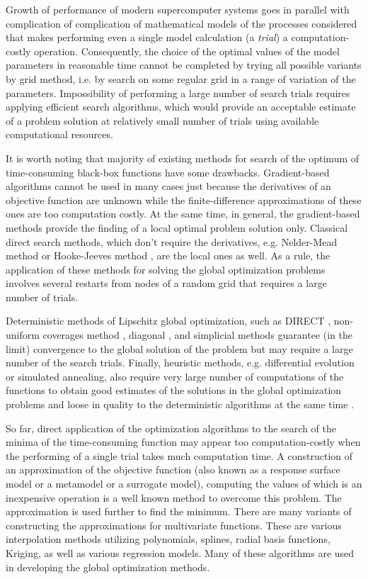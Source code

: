 \documentclass[applsci,article,submit,moreauthors,pdftex]{Definitions/mdpi}
\begin{document}
Growth of performance of modern supercomputer systems goes in parallel with complication of complication of mathematical models of the processes considered that makes performing even a single model calculation (a \textit{trial}) a computation-costly operation. Consequently, the choice of the optimal values of the model parameters in reasonable time cannot be completed by trying all possible variants by grid method, i.e. by search on some regular grid in a range of variation of the parameters. Impossibility of performing a large number of search trials requires applying efficient search algorithms, which would provide an acceptable estimate of a problem solution at relatively small number of trials using available computational resources.

It is worth noting that majority of existing methods for search of the optimum of time-consuming black-box functions have some drawbacks. Gradient-based algorithms cannot be used in many cases just because the derivatives of an objective function are unknown while the finite-difference approximations of these ones are too computation costly. At the same time, in general, the gradient-based methods provide the finding of a local optimal problem solution only.
Classical direct search methods, which don't require the derivatives, e.g. Nelder-Mead method \cite{NelderMead} or Hooke-Jeeves method \cite{HookJeeves}, are the local ones as well. As a rule, the application of these methods for solving the global optimization problems involves several restarts from nodes of a random grid that requires a large number of trials. 

Deterministic methods of Lipschitz global optimization, such as DIRECT \cite{Jones2009}, non-uniform coverages method \cite{Evtushenko2009, Evtushenko2013}, diagonal \cite{Sergeyev2017}, and simplicial \cite{Zilinskas2014} methods guarantee (in the limit) convergence to the global solution of the problem but may require a large number of the search trials.
Finally, heuristic methods, e.g. differential evolution or simulated annealing, also require very large number of computations of the functions to obtain good estimates of the solutions in the global optimization problems and loose in quality to the deterministic algorithms at the same time \cite{Sergeyev2018,Kvasov2018}.

So far, direct application of the optimization algorithms to the search of the minima of the time-consuming function may appear too computation-costly when the performing of a single trial takes much computation time.
A construction of an approximation of the objective function (also known as a response surface model or a metamodel or a surrogate model), computing the values of which is an inexpensive operation is a well known method to overcome this problem. The approximation is used further to find the minimum.
There are many variants of constructing the approximations for multivariate functions. These are various interpolation methods utilizing polynomials, splines, radial basis functions, Kriging, as well as various regression models. Many of these algorithms are used in developing the global optimization methods.
\end{document}
